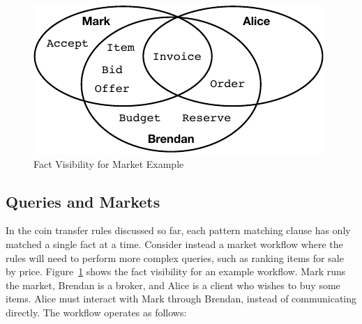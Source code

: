 \begin{figure}
\begin{center}
\includegraphics{figure/auction-visibility.pdf}
\end{center}
\vspace{-2ex}
\caption{Fact Visibility for Market Example}
\label{f:AuctionVisibility}
\end{figure}


\subsection{Queries and Markets}
\label{s:Query}
In the coin transfer rules discussed so far, each pattern matching clause has only matched a single fact at a time. Consider instead a market workflow where the rules will need to perform more complex queries, such as ranking items for sale by price. Figure~\ref{f:AuctionVisibility} shows the fact visibility for an example workflow. Mark runs the market, Brendan is a broker, and Alice is a client who wishes to buy some items. Alice must interact with Mark through Brendan, instead of communicating directly. The workflow operates as follows:

